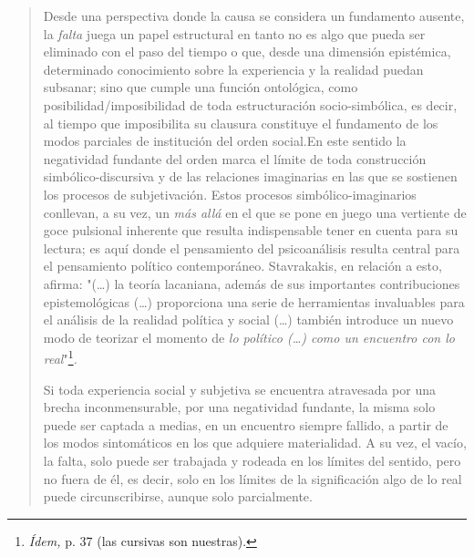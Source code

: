 \documentclass{book}
\begin{document}
\begin{quote}
Desde una perspectiva donde la causa se considera un fundamento ausente,
la \emph{falta} juega un papel estructural en tanto no es algo que pueda
ser eliminado con el paso del tiempo o que, desde una dimensión
epistémica, determinado conocimiento sobre la experiencia y la realidad
puedan subsanar; sino que cumple una función ontológica, como
posibilidad/imposibilidad de toda estructuración socio-simbólica, es
decir, al tiempo que imposibilita su clausura constituye el fundamento
de los modos parciales de institución del orden social.En este sentido
la negatividad fundante del orden marca el límite de toda construcción
simbólico-discursiva y de las relaciones imaginarias en las que se
sostienen los procesos de subjetivación. Estos procesos
simbólico-imaginarios conllevan, a su vez, un \emph{más allá} en el que
se pone en juego una vertiente de goce pulsional inherente que resulta
indispensable tener en cuenta para su lectura; es aquí donde el
pensamiento del psicoanálisis resulta central para el pensamiento
político contemporáneo. Stavrakakis, en relación a esto, afirma:
"(\dots) la teoría lacaniana, además de sus importantes
contribuciones epistemológicas (\dots) proporciona una serie de
herramientas invaluables para el análisis de la realidad política y
social (\dots) también introduce un nuevo modo de teorizar el
momento de \emph{lo político (\dots) como un encuentro con lo
real}"\footnote{\emph{Ídem,} p. 37 (las cursivas son nuestras).}\emph{.}

Si toda experiencia social y subjetiva se encuentra atravesada por una
brecha inconmensurable, por una negatividad fundante, la misma solo
puede ser captada a medias, en un encuentro siempre fallido, a partir de
los modos sintomáticos en los que adquiere materialidad. A su vez, el
vacío, la falta, solo puede ser trabajada y rodeada en los límites del
sentido, pero no fuera de él, es decir, solo en los límites de la
significación algo de lo real puede circunscribirse, aunque solo
parcialmente.


\end{quote}
\end{document}
